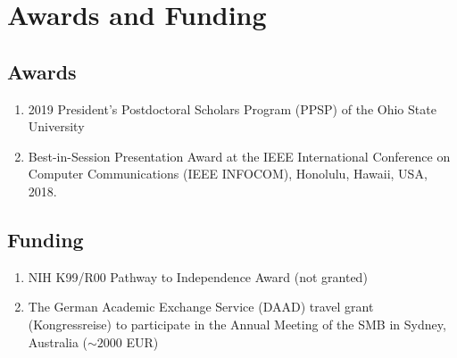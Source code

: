 \documentclass[11pt,a4paper,sans]{moderncv}        %
\begin{document}
\section{Awards and Funding}
\subsection{Awards}
\begin{enumerate}
\item{2019 President’s Postdoctoral Scholars Program (PPSP) of the Ohio State University}
\item{Best-in-Session Presentation Award at the IEEE International Conference on Computer Communications (IEEE INFOCOM), Honolulu, Hawaii, USA, 2018.}
\end{enumerate}


\subsection{Funding}
\begin{enumerate}
	\item NIH K99/R00 Pathway to Independence Award (not granted)
	\item {The  German Academic Exchange Service (DAAD) travel grant (Kongressreise) to participate in the Annual Meeting of the SMB in Sydney, Australia ($\sim 2000$ EUR)}
\end{enumerate}
\end{document}
